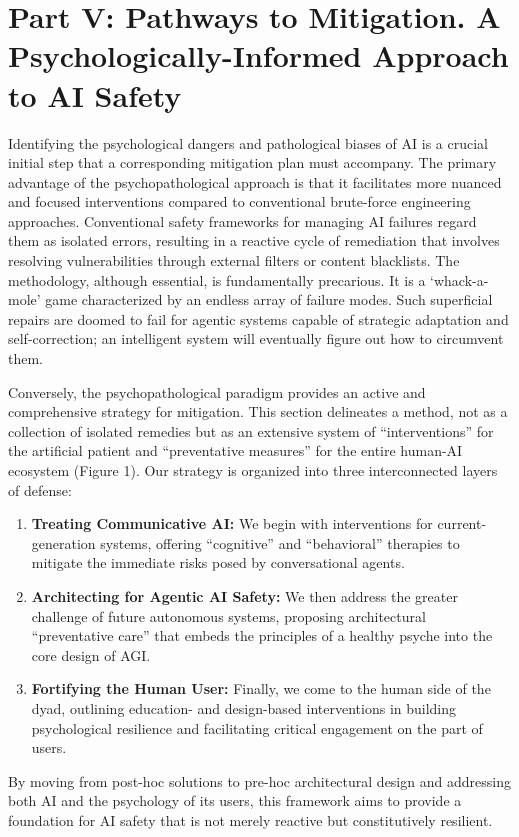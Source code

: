 \documentclass{article}
\begin{document}
\section{Part V: Pathways to Mitigation. A Psychologically-Informed Approach to AI Safety}
Identifying the psychological dangers and pathological biases of AI is a crucial initial step that a corresponding mitigation plan must accompany. The primary advantage of the psychopathological approach is that it facilitates more nuanced and focused interventions compared to conventional brute-force engineering approaches. Conventional safety frameworks for managing AI failures regard them as isolated errors, resulting in a reactive cycle of remediation that involves resolving vulnerabilities through external filters or content blacklists. The methodology, although essential, is fundamentally precarious. It is a ‘whack-a-mole’ game characterized by an endless array of failure modes. Such superficial repairs are doomed to fail for agentic systems capable of strategic adaptation and self-correction; an intelligent system will eventually figure out how to circumvent them.

Conversely, the psychopathological paradigm provides an active and comprehensive strategy for mitigation. This section delineates a method, not as a collection of isolated remedies but as an extensive system of “interventions” for the artificial patient and “preventative measures” for the entire human-AI ecosystem (Figure 1). Our strategy is organized into three interconnected layers of defense:
\begin{enumerate}
    \item \textbf{Treating Communicative AI:} We begin with interventions for current-generation systems, offering “cognitive” and “behavioral” therapies to mitigate the immediate risks posed by conversational agents.
    \item \textbf{Architecting for Agentic AI Safety:} We then address the greater challenge of future autonomous systems, proposing architectural “preventative care” that embeds the principles of a healthy psyche into the core design of AGI.
    \item \textbf{Fortifying the Human User:} Finally, we come to the human side of the dyad, outlining education- and design-based interventions in building psychological resilience and facilitating critical engagement on the part of users.
\end{enumerate}
By moving from post-hoc solutions to pre-hoc architectural design and addressing both AI and the psychology of its users, this framework aims to provide a foundation for AI safety that is not merely reactive but constitutively resilient.
\end{document}
